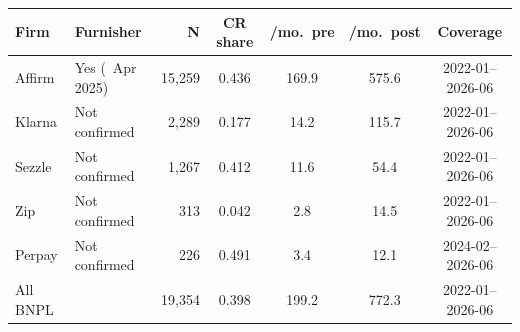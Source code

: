 \begin{tabular}{llrcccc}
\toprule
Firm & Furnisher & N & CR share & /mo.\ pre & /mo.\ post & Coverage \\
\midrule
Affirm & Yes (~Apr 2025) & 15,259 & 0.436 & 169.9 & 575.6 & 2022-01--2026-06 \\
Klarna & Not confirmed & 2,289 & 0.177 & 14.2 & 115.7 & 2022-01--2026-06 \\
Sezzle & Not confirmed & 1,267 & 0.412 & 11.6 & 54.4 & 2022-01--2026-06 \\
Zip & Not confirmed & 313 & 0.042 & 2.8 & 14.5 & 2022-01--2026-06 \\
Perpay & Not confirmed & 226 & 0.491 & 3.4 & 12.1 & 2024-02--2026-06 \\
\midrule
All BNPL &  & 19,354 & 0.398 & 199.2 & 772.3 & 2022-01--2026-06 \\
\bottomrule
\end{tabular}